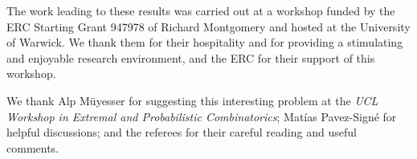 \documentclass[11pt, dvipsnames]{amsart}
\theoremstyle{plain}
\theoremstyle{definition}
\begin{document}
The work leading to these results was carried out at a workshop funded by the ERC Starting Grant 947978 of Richard Montgomery and hosted at the University of Warwick. We thank them for their hospitality and for providing a stimulating and enjoyable research environment, and the ERC for their support of this workshop.

We thank Alp M\"uyesser for suggesting this interesting problem at the \emph{UCL Workshop in Extremal and Probabilistic Combinatorics}; Mat\'{i}as Pavez-Sign\'{e} for helpful discussions;
and the referees for their careful reading and useful comments.





\end{document}
